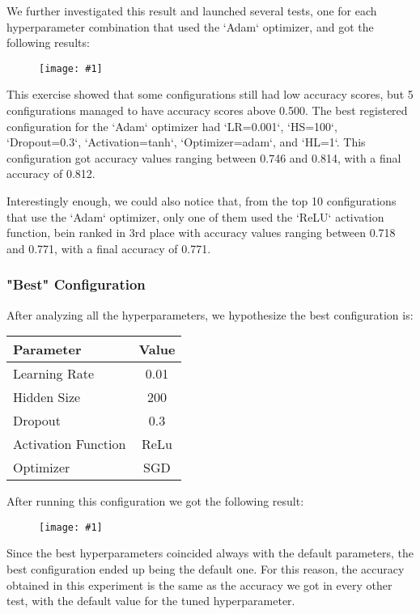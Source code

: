 \documentclass[10pt]{article}
\newcommand{\img}[1]{\begin{figure}[H]\centering\texttt{[image: \#1]}\end{figure}}
\begin{document}
We further investigated this result and launched several tests, one for each hyperparameter combination that used the `Adam` optimizer, and got the following results:

\img{tuning/adam.png}

This exercise showed that some configurations still had low accuracy scores, but 5 configurations managed to have accuracy scores above 0.500.
The best registered configuration for the `Adam` optimizer had `LR=0.001`, `HS=100`, `Dropout=0.3`, `Activation=tanh`, `Optimizer=adam`, and `HL=1`. This configuration got accuracy values ranging between 0.746 and 0.814, with a final accuracy of 0.812.

Interestingly enough, we could also notice that, from the top 10 configurations that use the `Adam` optimizer, only one of them used the `ReLU` activation function, bein ranked in 3rd place with accuracy values ranging between 0.718 and 0.771, with a final accuracy of 0.771.


\subsubsection{"Best" Configuration}

After analyzing all the hyperparameters, we hypothesize the best configuration is:
\begin{center}
\begin{tabular}{||l|c||}
\hline
Parameter           & Value \\
\hline\hline
Learning Rate       & 0.01  \\
\hline
Hidden Size         & 200   \\
\hline
Dropout             & 0.3   \\
\hline
Activation Function & ReLu  \\
\hline
Optimizer           & SGD   \\
\hline
\end{tabular}
\end{center}
After running this configuration we got the following result:

\img{tuning/best.png}

Since the best hyperparameters coincided always with the default parameters, the best configuration ended up being the default one.
For this reason, the accuracy obtained in this experiment is the same as the accuracy we got in every other test, with the default value for the tuned hyperparameter.
\end{document}
